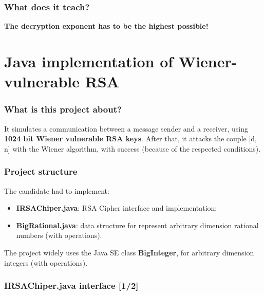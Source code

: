 \documentclass{beamer}
\begin{document}
  \begin{frame}
  \frametitle{What does it teach?}
    \begin{center}
           \textbf{The decryption exponent has to be the highest possible!}
    \end{center}
  \end{frame}
  		
\section{Java implementation of Wiener-vulnerable RSA}

  \frame{\sectionpage}
  
  \begin{frame}
  \frametitle{What is this project about?}
    It simulates a communication between a message sender and a receiver, using \textbf{1024 bit Wiener vulnerable RSA keys}. After that, it attacks the couple [d, n] with the Wiener algorithm, with success (because of the respected conditions).
  \end{frame}
  
    \begin{frame}
    \frametitle{Project structure}
    
    The candidate had to implement:
    
    \begin{itemize}
    	\item \textbf{IRSAChiper.java}: RSA Cipher interface and implementation;
    	\item \textbf{BigRational.java}: data structure for represent arbitrary dimension rational numbers (with operations).
    	\end{itemize}
    
    The project widely uses the Java SE class \textbf{BigInteger}, for arbitrary dimension integers (with operations).
    
    
    
    
  
  \end{frame}
  
  
\begin{frame}
  \frametitle{IRSAChiper.java interface [1/2]}
    
    \lstset{basicstyle=\tiny}
    
    
  \end{frame}
  
\end{document}

